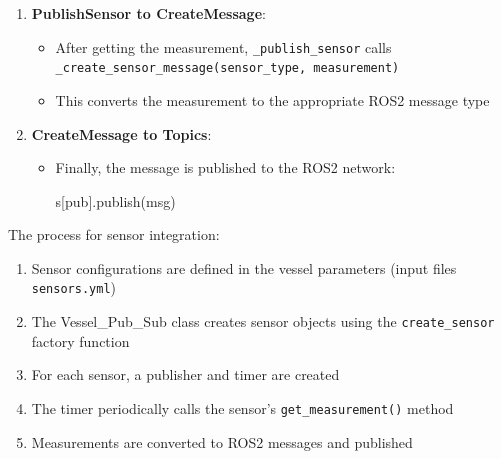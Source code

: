 \documentclass[
  letterpaper,
  DIV=11,
  numbers=noendperiod]{scrreprt}
\newenvironment{Shaded}{\begin{snugshade}}{\end{snugshade}}
\newcommand{\NormalTok}[1]{\textcolor[rgb]{0.00,0.23,0.31}{#1}}
\newcommand{\StringTok}[1]{\textcolor[rgb]{0.13,0.47,0.30}{#1}}
\providecommand{\tightlist}{%
  \setlength{\itemsep}{0pt}\setlength{\parskip}{0pt}}\usepackage{longtable,booktabs,array}
\begin{document}
\begin{enumerate}
  \begin{itemize}
  \tightlist
  \item
    The \texttt{\_publish\_sensor} method calls
    \texttt{sensor.get\_measurement()} to obtain the latest sensor
    reading
  \item
    Each sensor type has its own implementation of
    \texttt{get\_measurement()}
  \end{itemize}
\item
  \textbf{PublishSensor to CreateMessage}:

  \begin{itemize}
  \tightlist
  \item
    After getting the measurement, \texttt{\_publish\_sensor} calls
    \texttt{\_create\_sensor\_message(sensor\_type,\ measurement)}
  \item
    This converts the measurement to the appropriate ROS2 message type
  \end{itemize}
\item
  \textbf{CreateMessage to Topics}:

  \begin{itemize}
  \item
    Finally, the message is published to the ROS2 network:

\begin{Shaded}
\begin{Highlighting}[]
\NormalTok{s[}\StringTok{\textquotesingle{}pub\textquotesingle{}}\NormalTok{].publish(msg)}
\end{Highlighting}
\end{Shaded}
  \end{itemize}
\end{enumerate}

The process for sensor integration:

\begin{enumerate}
\def\labelenumi{\arabic{enumi}.}
\tightlist
\item
  Sensor configurations are defined in the vessel parameters (input
  files \texttt{sensors.yml})
\item
  The Vessel\_Pub\_Sub class creates sensor objects using the
  \texttt{create\_sensor} factory function
\item
  For each sensor, a publisher and timer are created
\item
  The timer periodically calls the sensor's \texttt{get\_measurement()}
  method
\item
  Measurements are converted to ROS2 messages and published
\end{enumerate}
\end{document}
